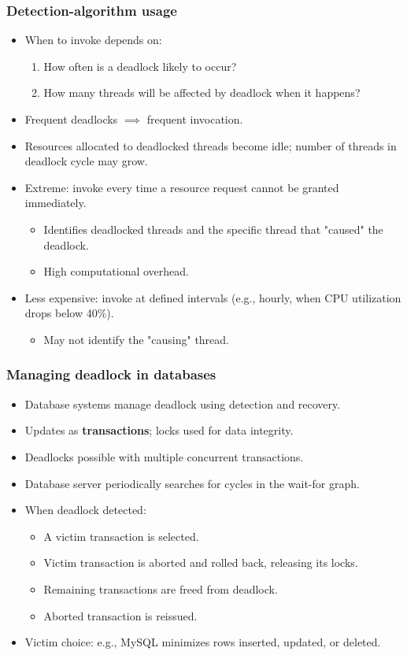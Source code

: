 \subsubsection{Detection-algorithm usage}
\begin{itemize}
    \item When to invoke depends on:
    \begin{enumerate}
        \item How often is a deadlock likely to occur?
        \item How many threads will be affected by deadlock when it happens?
    \end{enumerate}
    \item Frequent deadlocks $\implies$ frequent invocation.
    \item Resources allocated to deadlocked threads become idle; number of threads in deadlock cycle may grow.
    \item Extreme: invoke every time a resource request cannot be granted immediately.
    \begin{itemize}
        \item Identifies deadlocked threads and the specific thread that "caused" the deadlock.
        \item High computational overhead.
    \end{itemize}
    \item Less expensive: invoke at defined intervals (e.g., hourly, when CPU utilization drops below 40\%).
    \begin{itemize}
        \item May not identify the "causing" thread.
    \end{itemize}
\end{itemize}

\subsubsection*{Managing deadlock in databases}
\begin{itemize}
    \item Database systems manage deadlock using detection and recovery.
    \item Updates as \textbf{transactions}; locks used for data integrity.
    \item Deadlocks possible with multiple concurrent transactions.
    \item Database server periodically searches for cycles in the wait-for graph.
    \item When deadlock detected:
    \begin{itemize}
        \item A victim transaction is selected.
        \item Victim transaction is aborted and rolled back, releasing its locks.
        \item Remaining transactions are freed from deadlock.
        \item Aborted transaction is reissued.
    \end{itemize}
    \item Victim choice: e.g., MySQL minimizes rows inserted, updated, or deleted.
\end{itemize}

